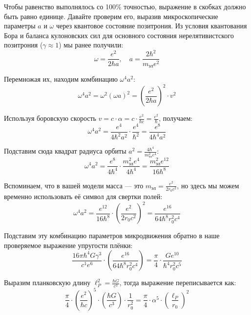 \documentclass[12pt,a4paper]{article}
\begin{document}
Чтобы равенство выполнялось со 100\% точностью, выражение в скобках должно быть равно единице. Давайте проверим его, выразив микроскопические параметры $a$ и $\omega$ через квантовое состояние позитрония. Из условия квантования Бора и баланса кулоновских сил для основного состояния нерелятивистского позитрония ($\gamma \approx 1$) мы ранее получили:
\begin{equation}
\omega = \frac{e^2}{2\hbar a}, \quad a = \frac{2\hbar^2}{m_{эл} e^2}
\end{equation}

Перемножая их, находим комбинацию $\omega^4 a^2$:
\begin{equation}
\omega^4 a^2 = \omega^2 (\omega a)^2 = \left(\frac{e^2}{2\hbar a}\right)^2 \cdot v^2
\end{equation}

Используя боровскую скорость $v = c \cdot \alpha = c \cdot \frac{e^2}{\hbar c} = \frac{e^2}{\hbar}$, получаем:
\begin{equation}
\omega^4 a^2 = \frac{e^4}{4\hbar^2 a^2} \cdot \frac{e^4}{\hbar^2} = \frac{e^8}{4 \hbar^4 a^2}
\end{equation}

Подставим сюда квадрат радиуса орбиты $a^2 = \frac{4\hbar^4}{m_{эл}^2 e^4}$:
\begin{equation}
\omega^4 a^2 = \frac{e^8}{4 \hbar^4} \cdot \frac{m_{эл}^2 e^4}{4 \hbar^4} = \frac{m_{эл}^2 e^{12}}{16 \hbar^8}
\end{equation}

Вспоминаем, что в вашей модели масса — это $m_{эл} = \frac{e^2}{2r_0 c^2}$, но здесь мы можем временно использовать её символ для свертки полей:
\begin{equation}
\omega^4 a^2 = \frac{e^{12}}{16 \hbar^8} \cdot \left( \frac{e^2}{2r_0 c^2} \right)^2 = \frac{e^{16}}{64 \hbar^8 r_0^2 c^4}
\end{equation}

Подставим эту комбинацию параметров микродвижения обратно в наше проверяемое выражение упругости плёнки:
\begin{equation}
\frac{16\pi \hbar^4 G \gamma^3}{c^1 e^6} \cdot \left( \frac{e^{16}}{64 \hbar^8 r_0^2 c^4} \right) = \frac{\pi}{4} \cdot \frac{G e^{10}}{\hbar^4 r_0^2 c^5}
\end{equation}

Выразим планковскую длину $\ell_P^2 = \frac{\hbar G}{c^3}$, тогда выражение переписывается как:
\begin{equation}
\frac{\pi}{4} \cdot \left(\frac{e^2}{\hbar c}\right)^5 \cdot \left(\frac{\hbar G}{c^3}\right) \cdot \frac{1}{r_0^2} = \frac{\pi}{4} \cdot \alpha^5 \cdot \left(\frac{\ell_P}{r_0}\right)^2
\end{equation}
\end{document}
